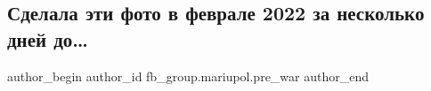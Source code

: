  
 
 
 
 

\subsection{Сделала эти фото в феврале 2022 за несколько дней до…}
\label{sec:11_02_2023.fb.fb_group.mariupol.pre_war.4.sdelala_eti_foto_v_f}

\ifcmt
 author_begin
   author_id fb_group.mariupol.pre_war
 author_end
\fi
